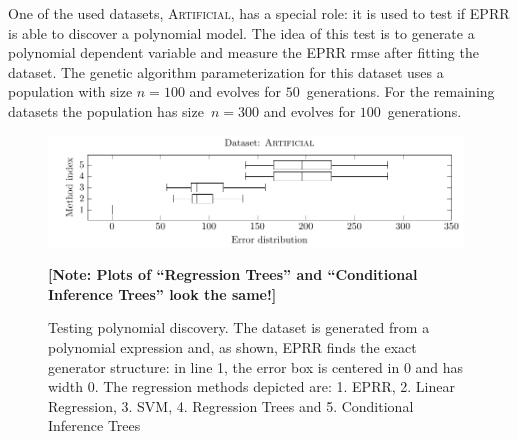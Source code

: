 \documentclass[preprint,authoryear,12pt]{elsarticle}
\newcommand{\note}[1]{\textbf{\small{[Note: {#1}]}}}
\begin{document}
One of the used datasets, \textsc{Artificial}, has a special role: it is used to test if \ac{EPRR} is able to discover a polynomial model. The idea of this test is to generate a polynomial dependent variable and measure the \ac{EPRR} \ac{rmse} after fitting the dataset. The genetic algorithm parameterization for this dataset uses a population with size $n=100$ and evolves for $50$~generations. For the remaining datasets the population has size~$n=300$ and evolves for $100$~generations.

\begin{figure}[tb]\begin{center}
\includegraphics[width=0.98\textwidth]{figure_2.pdf}
\caption{Testing polynomial discovery. The dataset is generated from a polynomial expression and, as shown, \ac{EPRR} finds the exact generator structure: in line 1, the error box is centered in $0$ and has width $0$.  The regression methods depicted are: 1. \ac{EPRR}, 2. Linear Regression, 3. SVM, 4. Regression Trees and 5. Conditional Inference Trees}
\note{Plots of ``Regression Trees'' and ``Conditional Inference Trees'' look the same!} 
\label{artificial_dataset1_lambda1.0}
\end{center}
\end{figure}
\end{document}
